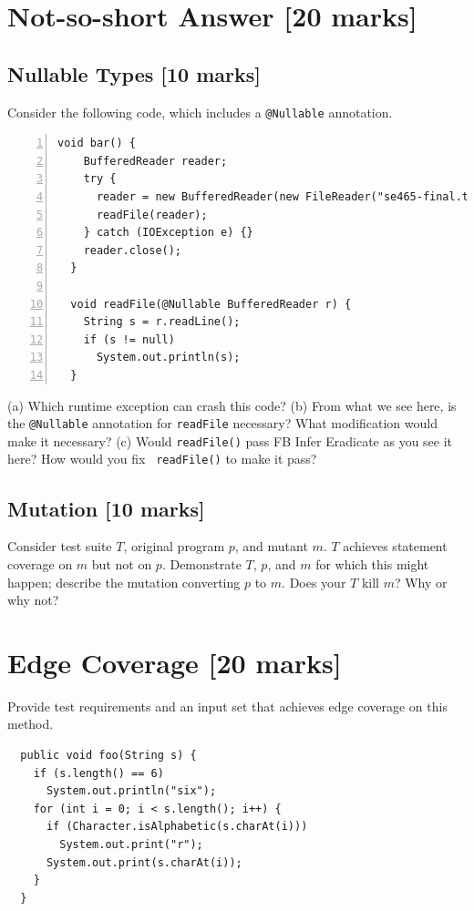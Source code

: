 \documentclass[12pt]{article}
\begin{document}
\section{Not-so-short Answer [20 marks]}


\subsection{Nullable Types [10 marks]}
Consider the following code, which includes a {\tt @Nullable} annotation.
\begin{lstlisting}[numbers=left]
  void bar() {
    BufferedReader reader;
    try {
      reader = new BufferedReader(new FileReader("se465-final.txt"));
      readFile(reader);
    } catch (IOException e) {}
    reader.close();
  }

  void readFile(@Nullable BufferedReader r) {
    String s = r.readLine();
    if (s != null)
      System.out.println(s);
  }
\end{lstlisting}

(a) Which runtime exception can crash this code? (b) From what we see
here, is the {\tt @Nullable} annotation for {\tt readFile} necessary?
What modification would make it necessary? (c) Would {\tt readFile()}
pass FB Infer Eradicate as you see it here? How would you fix {\tt
  readFile()} to make it pass?

\vspace*{13em}

\subsection{Mutation [10 marks]}
Consider test suite $T$, original program $p$, and mutant $m$. $T$ achieves statement coverage
on $m$ but not on $p$. Demonstrate $T$, $p$, and $m$ for which this might happen;
describe the mutation converting $p$ to $m$. Does your $T$ kill $m$? Why or why not?
\vspace*{16em}

\newpage
\section{Edge Coverage [20 marks]}
Provide test requirements and an input set that achieves edge coverage on this method.

\begin{lstlisting}
  public void foo(String s) {
    if (s.length() == 6)
      System.out.println("six");
    for (int i = 0; i < s.length(); i++) {
      if (Character.isAlphabetic(s.charAt(i)))
        System.out.print("r");
      System.out.print(s.charAt(i));
    }
  }
\end{lstlisting}
\end{document}
